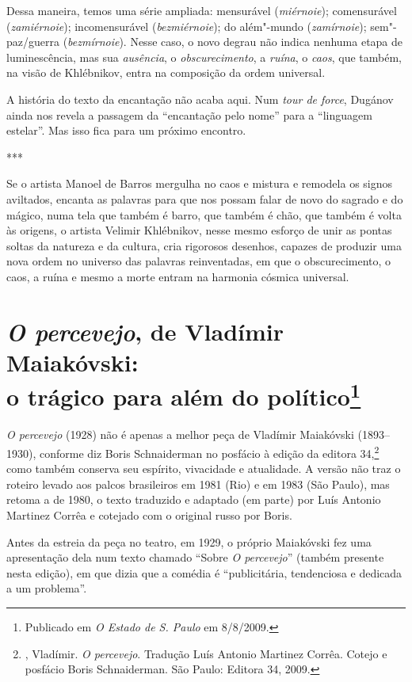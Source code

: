 Dessa maneira, temos uma série ampliada: mensurável (\emph{miérnoie});
comensurável (\emph{zamiérnoie}); incomensurável (\emph{bezmiérnoie});
do além"-mundo (\emph{zamírnoie}); sem"-paz/guerra (\emph{bezmírnoie}).
Nesse caso, o novo degrau não indica nenhuma etapa de luminescência, mas
sua \emph{ausência}, o \emph{obscurecimento}, a \emph{ruína}, o \emph{caos}, que também, na visão de
Khlébnikov, entra na composição da ordem universal.

A história do texto da encantação não acaba aqui. Num
\emph{tour de force}, Dugánov ainda nos revela a passagem da
``encantação pelo nome'' para a ``linguagem estelar''. Mas isso fica
para um próximo encontro.

\begin{center}
***
\end{center}

Se o artista Manoel de Barros mergulha no caos e mistura e remodela os
signos aviltados, encanta as palavras para que nos possam falar de novo
do sagrado e do mágico, numa tela que também é barro, que também é chão,
que também é volta às origens, o artista Velimir Khlébnikov, nesse mesmo
esforço de unir as pontas soltas da natureza e da cultura, cria
rigorosos desenhos, capazes de produzir uma nova ordem no universo das
palavras reinventadas, em que o obscurecimento, o caos, a ruína e mesmo
a morte entram na harmonia cósmica universal.


\chapter{\emph{O percevejo}, de Vladímir Maiakóvski:\\
o trágico para além do político\footnote{Publicado em \emph{O Estado de S.
Paulo} em 8/8/2009.}}
\label{percevejo}

\emph{O percevejo} (1928) não é apenas a melhor peça de Vladímir
Maiakóvski (1893--1930), conforme diz Boris Schnaiderman no posfácio à
edição da editora 34,\footnote{, Vladímir.
\emph{O percevejo}. Tradução Luís Antonio Martinez Corrêa. Cotejo
e posfácio Boris Schnaiderman. São Paulo: Editora 34, 2009.} como
também conserva seu espírito, vivacidade e atualidade. A versão
não traz o roteiro levado aos palcos brasileiros em 1981 (Rio)
e em 1983 (São Paulo), mas retoma a de 1980, o texto traduzido
e adaptado (em parte) por Luís Antonio Martinez Corrêa e cotejado
com o original russo por Boris.

Antes da estreia da peça no teatro, em 1929, o próprio Maiakóvski fez
uma apresentação dela num texto chamado ``Sobre \emph{O percevejo}''
(também presente nesta edição), em que dizia que a comédia é
``publicitária, tendenciosa e dedicada a um problema''.

